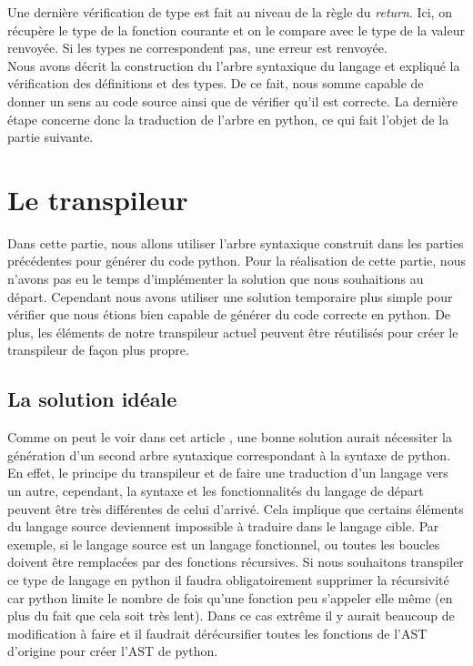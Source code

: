 \documentclass[a4paper]{article}%
\begin{document}
Une dernière vérification de type est fait au niveau de la règle du
\textit{return}. Ici, on récupère le type de la fonction courante et on le
compare avec le type de la valeur renvoyée. Si les types ne correspondent pas,
une erreur est renvoyée.\\

Nous avons décrit la construction du l'arbre syntaxique du langage et expliqué
la vérification des définitions et des types. De ce fait, nous somme capable de
donner un sens au code source ainsi que de vérifier qu'il est correcte. La
dernière étape concerne donc la traduction de l'arbre en python, ce qui fait
l'objet de la partie suivante.

\clearpage
\section{Le transpileur}

Dans cette partie, nous allons utiliser l'arbre syntaxique construit dans les
parties précédentes pour générer du code python. Pour la réalisation de cette
partie, nous n'avons pas eu le temps d'implémenter la solution que nous
souhaitions au départ. Cependant nous avons utiliser une solution temporaire
plus simple pour vérifier que nous étions bien capable de générer du code
correcte en python. De plus, les éléments de notre transpileur actuel peuvent
être réutilisés pour créer le transpileur de façon plus propre.

\subsection{La solution idéale}

Comme on peut le voir dans cet article \cite{tutotranspiler}, une bonne solution
aurait nécessiter la génération d'un second arbre syntaxique correspondant à la
syntaxe de python. En effet, le principe du transpileur et de faire une
traduction d'un langage vers un autre, cependant, la syntaxe et les
fonctionnalités du langage de départ peuvent être très différentes de celui
d'arrivé. Cela implique que certains éléments du langage source deviennent
impossible à traduire dans le langage cible. Par exemple, si le langage source
est un langage fonctionnel, ou toutes les boucles doivent être remplacées par des
fonctions récursives. Si nous souhaitons transpiler ce type de langage en python
il faudra obligatoirement supprimer la récursivité car python limite le
nombre de fois qu'une fonction peu s'appeler elle même (en plus du fait que cela
soit très lent). Dans ce cas extrême il y aurait beaucoup de modification à
faire et il faudrait dérécursifier toutes les fonctions de l'AST d'origine pour
créer l'AST de python.
\end{document}
